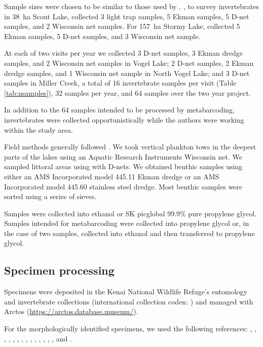 \begin{multicols}{2}
Sample sizes were chosen to be similar to those used by \citet{Massengill2014, Massengill2017}. \citet{Massengill2014}, to survey invertebrates in 38~ha Scout Lake, collected 3 light trap samples, 5 Ekman samples, 5 D-net samples, and 2 Wisconsin net samples. For 157~ha Stormy Lake, \citet{Massengill2014, Massengill2017} collected 5 Ekman samples, 5 D-net samples, and 3 Wisconsin net sample.



At each of two visits per year we collected 3 D-net samples, 3 Ekman dredge samples, and 2 Wisconsin net samples in Vogel Lake; 2 D-net samples, 2 Ekman dredge samples, and 1 Wisconsin net sample in North Vogel Lake; and 3 D-net samples in Miller Creek, a total of 16 invertebrate samples per visit (Table \ref{tab:nsamples}), 32 samples per year, and 64 samples over the two year project.

In addition to the 64 samples intended to be processed by metabarcoding, invertebrates were collected opportunistically while the authors were working within the study area.

Field methods generally followed \citet{Massengill2014, Massengill2017}. We took vertical plankton tows in the deepest parts of the lakes using an Aquatic Research Instruments Wisconsin net. We sampled littoral areas using with D-nets. We obtained benthic samples using either an AMS Incorporated model 445.11 Ekman dredge or an AMS Incorporated model 445.60  stainless steel dredge. Most benthic samples were sorted using a series of sieves.

Samples were collected into ethanol or SK picglobal 99.9\% pure propylene glycol. Samples intended for metabarcoding were collected into propylene glycol or, in the case of two samples, collected into ethanol and then transferred to propylene glycol.

\subsection{Specimen processing}

Specimens were deposited in the Kenai National Wildlife Refuge's entomology and invertebrate collections (international collection coden: ) and managed with Arctos (\url{https://arctos.database.museum/}).

For the morphologically identified specimens, we used the following references: \cite{Borroretal1989}, \cite{Brooks1957}, \cite{Collet2008}, \cite{Durfee2005}, \cite{Haneyetal2013}, \cite{Hatch1953}, \cite{Kenner2009}, \cite{Marx1957}, \cite{MerrittCummins1996}, \cite{Merrittetal2008}, \cite{Reid1987}, \cite{Rileyetal2002}, \cite{Roughley2000}, \cite{Wallis1933}, and \cite{White1983}.


\end{multicols}
